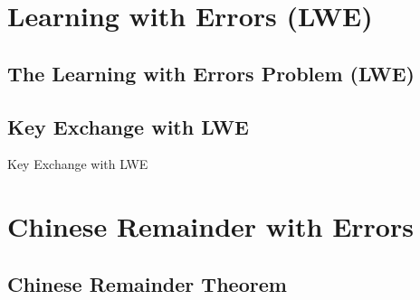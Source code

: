 \documentclass{beamer}
\begin{document}
        
\section{Learning with Errors (LWE)}

    \subsection{The Learning with Errors Problem (LWE)}


        

    \subsection{Key Exchange with LWE}
    

        \begin{frame}{Key Exchange with LWE}
        
            
        \end{frame}



\section{Chinese Remainder with Errors} 

    \subsection{Chinese Remainder Theorem} 
    

        
        
\end{document}
